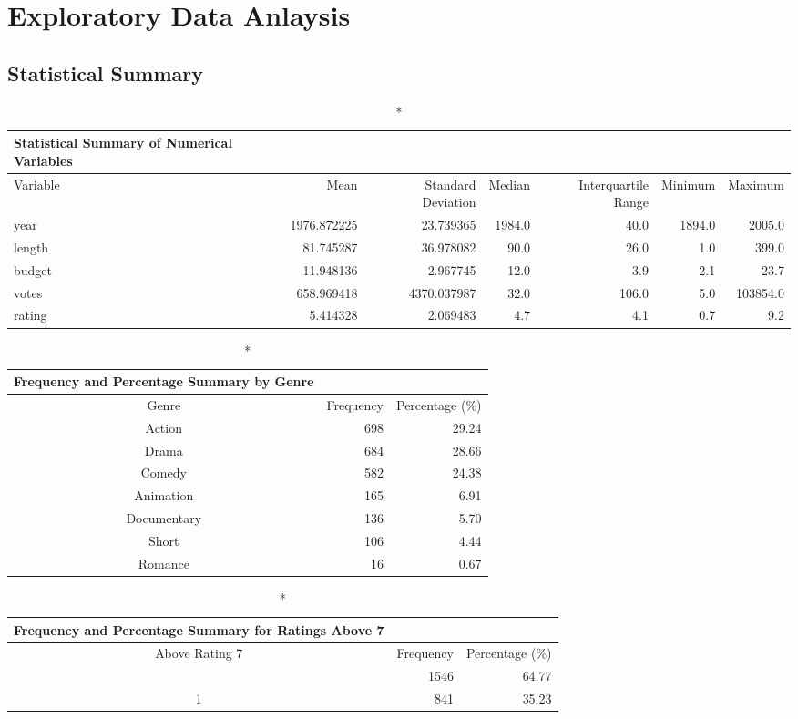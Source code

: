 \documentclass[
  11pt,
]{article}
\begin{document}
\hypertarget{exploratory-data-anlaysis}{%
\section{Exploratory Data Anlaysis}\label{exploratory-data-anlaysis}}

\hypertarget{statistical-summary}{%
\subsection{Statistical Summary}\label{statistical-summary}}

\begin{longtable*}{lrrrrrr}
\caption*{
{\large Statistical Summary of Numerical Variables}
} \\ 
\toprule
Variable & Mean & Standard Deviation & Median & Interquartile Range & Minimum & Maximum \\ 
\midrule\addlinespace[2.5pt]
year & 1976.872225 & 23.739365 & 1984.0 & 40.0 & 1894.0 & 2005.0 \\ 
length & 81.745287 & 36.978082 & 90.0 & 26.0 & 1.0 & 399.0 \\ 
budget & 11.948136 & 2.967745 & 12.0 & 3.9 & 2.1 & 23.7 \\ 
votes & 658.969418 & 4370.037987 & 32.0 & 106.0 & 5.0 & 103854.0 \\ 
rating & 5.414328 & 2.069483 & 4.7 & 4.1 & 0.7 & 9.2 \\ 
\bottomrule
\end{longtable*}

\begin{longtable*}{crr}
\caption*{
{\large Frequency and Percentage Summary by Genre}
} \\ 
\toprule
Genre & Frequency & Percentage (\%) \\ 
\midrule\addlinespace[2.5pt]
Action & 698 & 29.24 \\ 
Drama & 684 & 28.66 \\ 
Comedy & 582 & 24.38 \\ 
Animation & 165 & 6.91 \\ 
Documentary & 136 & 5.70 \\ 
Short & 106 & 4.44 \\ 
Romance & 16 & 0.67 \\ 
\bottomrule
\end{longtable*}

\begin{longtable*}{crr}
\caption*{
{\large Frequency and Percentage Summary for Ratings Above 7}
} \\ 
\toprule
Above Rating 7 & Frequency & Percentage (\%) \\ 
\midrule{} & 1546 & 64.77 \\ 
1 & 841 & 35.23 \\ 
\bottomrule
\end{longtable*}
\end{document}
